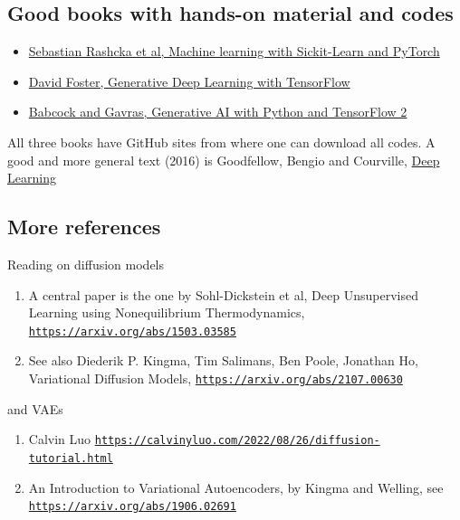 \documentclass[%
oneside,                 %
final,                   %
10pt]{article}
\begin{document}
\subsection{Good books with hands-on material and codes}
\begin{block}{}
\begin{itemize}
\item \href{{https://sebastianraschka.com/blog/2022/ml-pytorch-book.html}}{Sebastian Rashcka et al, Machine learning with Sickit-Learn and PyTorch}

\item \href{{https://www.oreilly.com/library/view/generative-deep-learning/9781098134174/ch01.html}}{David Foster, Generative Deep Learning with TensorFlow}

\item \href{{https://github.com/PacktPublishing/Hands-On-Generative-AI-with-Python-and-TensorFlow-2}}{Babcock and Gavras, Generative AI with Python and TensorFlow 2}
\end{itemize}

\noindent
\end{block}

All three books have GitHub sites from where  one can download all codes. A good and more general text (2016)
is Goodfellow, Bengio and Courville, \href{{https://www.deeplearningbook.org/}}{Deep Learning}

\subsection{More references}

\begin{block}{Reading on diffusion models }
\begin{enumerate}
\item A central paper is the one by Sohl-Dickstein et al, Deep Unsupervised Learning using Nonequilibrium Thermodynamics, \href{{https://arxiv.org/abs/1503.03585}}{\nolinkurl{https://arxiv.org/abs/1503.03585}}

\item See also Diederik P. Kingma, Tim Salimans, Ben Poole, Jonathan Ho, Variational Diffusion Models, \href{{https://arxiv.org/abs/2107.00630}}{\nolinkurl{https://arxiv.org/abs/2107.00630}}
\end{enumerate}

\noindent
\end{block}   

\begin{block}{and VAEs }
\begin{enumerate}
\item Calvin Luo \href{{https://calvinyluo.com/2022/08/26/diffusion-tutorial.html}}{\nolinkurl{https://calvinyluo.com/2022/08/26/diffusion-tutorial.html}}

\item An Introduction to Variational Autoencoders, by Kingma and Welling, see \href{{https://arxiv.org/abs/1906.02691}}{\nolinkurl{https://arxiv.org/abs/1906.02691}}
\end{enumerate}

\noindent
\end{block}
\end{document}
